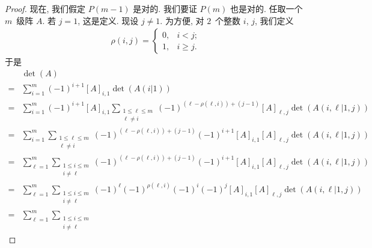 \documentclass[../libro.tex]{subfiles}
\begin{document}
\begin{proof}
    现在, 我们假定 \(P(m-1)\) 是对的.
    我们要证 \(P(m)\) 也是对的.
    任取一个 \(m\)~级阵 \(A\).
    若 \(j = 1\), 这是定义.
    现设 \(j \neq 1\).
    为方便, 对 \(2\)~个整数 \(i\), \(j\), 我们定义
    \begin{align*}
        \rho(i, j) =
        \begin{cases}
            0, & i < j;    \\
            1, & i \geq j.
        \end{cases}
    \end{align*}
    于是
    \begingroup
    \reqnomode
    \begin{align*}
        &
        \det {(A)}
        \\
        = {} &
        \sum_{i = 1}^{m} {
            (-1)^{i+1} [A]_{i,1} \det {(A(i|1))}
        }
        \tag*{(1)}
        \\
        = {} &
        \sum_{i = 1}^{m} {
            (-1)^{i+1} [A]_{i,1}
            \sum_{\substack{1 \leq \ell \leq m \\ \ell \neq i}} {
                (-1)^{(\ell - \rho(\ell, i)) + (j - 1)}
                [A]_{\ell,j} \det {(A({i,\ell}|{1,j}))}
            }
        }
        \tag*{(2)}
        \\
        = {} &
        \sum_{i = 1}^{m} {
            \sum_{\substack{1 \leq \ell \leq m \\ \ell \neq i}} {
                (-1)^{(\ell - \rho(\ell, i)) + (j - 1)}
                (-1)^{i+1}
                [A]_{i,1} [A]_{\ell,j} \det {(A({i,\ell}|{1,j}))}
            }
        }
        \tag*{(3)}
        \\
        = {} &
        \sum_{\ell = 1}^{m} {
            \sum_{\substack{1 \leq i \leq m \\ i \neq \ell}} {
                (-1)^{(\ell - \rho(\ell, i)) + (j - 1)}
                (-1)^{i+1}
                [A]_{i,1} [A]_{\ell,j} \det {(A({i,\ell}|{1,j}))}
            }
        }
        \tag*{(4)}
        \\
        = {} &
        \sum_{\ell = 1}^{m} {
            \sum_{\substack{1 \leq i \leq m \\ i \neq \ell}} {
                (-1)^{\ell} (-1)^{\rho(\ell, i)} (-1)^{i} (-1)^{j}
                [A]_{i,1} [A]_{\ell,j} \det {(A({i,\ell}|{1,j}))}
            }
        }
        \tag*{(5)}
        \\
        = {} &
        \sum_{\ell = 1}^{m} {
            \sum_{\substack{1 \leq i \leq m \\ i \neq \ell}} {
}}
\end{align*}
\end{proof}
\end{document}
